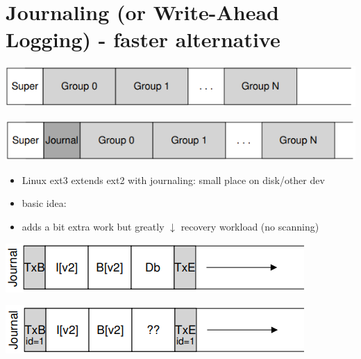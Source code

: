 \section*{Journaling (or Write-Ahead Logging) - faster alternative}
\begin{minipage}{.5\linewidth}
  \includegraphics[width=\linewidth]{imgs/jn_ext2}
\end{minipage}
\begin{minipage}{.5\linewidth}
  \includegraphics[width=\linewidth]{imgs/jn_ext3}
\end{minipage}
\begin{itemize}
\item Linux ext3 extends ext2 with journaling: small place on disk/other dev
\item basic idea:
\item adds a bit extra work but greatly $\downarrow$ recovery workload (no scanning)
\end{itemize}
\begin{minipage}{.5\linewidth}
\includegraphics[width=\linewidth]{imgs/jn_dj1}
\end{minipage}
\begin{minipage}{.5\linewidth}
\includegraphics[width=\linewidth]{imgs/jn_dj2}
\end{minipage}
